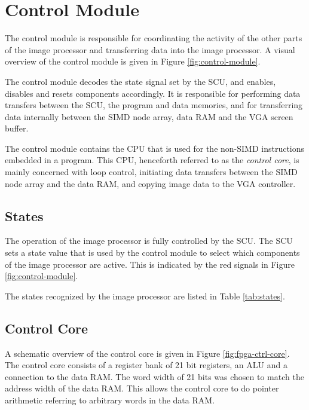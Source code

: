 \section{Control Module}

The control module is responsible for coordinating the activity of the
other parts of the image processor and transferring data into 
the image processor. A visual overview of the control module is given in
Figure \ref{fig:control-module}.



The control module decodes the state signal set by the SCU, and enables,
disables and resets components accordingly. It is responsible for performing
data transfers between the SCU, the program and data memories, and for
transferring data internally between the \ac{SIMD} node array, data \ac{RAM}
and the \ac{VGA} screen buffer. %

The control module contains the \ac{CPU} that is used for the non-\ac{SIMD}
instructions embedded in a program. This \ac{CPU}, henceforth referred to as the
\emph{control core}, is mainly concerned with loop control, initiating data
transfers between the \ac{SIMD} node array and the data RAM, and copying image
data to the \ac{VGA} controller.

\subsection{States}

The operation of the image processor is fully controlled by the \ac{SCU}. The
\ac{SCU} sets a state value that is used by the control module to select which
components of the image processor are active. This is indicated by the red
signals in Figure
\ref{fig:control-module}.

The states recognized by the image processor are listed in Table
\ref{tab:states}.



\subsection{Control Core}

A schematic overview of the control core is given in Figure
\ref{fig:fpga-ctrl-core}. The control core consists of a register bank
of 21 bit registers, an \ac{ALU} and a connection to the data \ac{RAM}. The word
width of 21 bits was chosen to match the address width of the data \ac{RAM}.
This allows the control core to do pointer arithmetic referring to
arbitrary words in the data \ac{RAM}.

